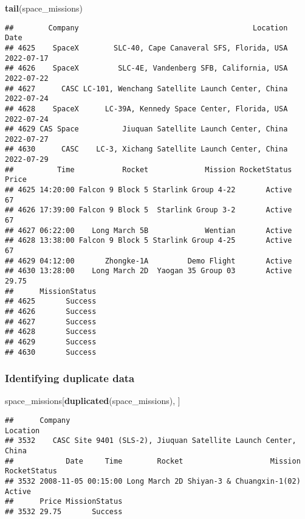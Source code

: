 \documentclass[
]{article}
\newenvironment{Shaded}{\begin{snugshade}}{\end{snugshade}}
\newcommand{\FunctionTok}[1]{\textcolor[rgb]{0.13,0.29,0.53}{\textbf{#1}}}
\newcommand{\NormalTok}[1]{#1}
\begin{document}
\begin{Shaded}
\begin{Highlighting}[]
\FunctionTok{tail}\NormalTok{(space\_missions)}
\end{Highlighting}
\end{Shaded}

\begin{verbatim}
##        Company                                        Location       Date
## 4625    SpaceX        SLC-40, Cape Canaveral SFS, Florida, USA 2022-07-17
## 4626    SpaceX         SLC-4E, Vandenberg SFB, California, USA 2022-07-22
## 4627      CASC LC-101, Wenchang Satellite Launch Center, China 2022-07-24
## 4628    SpaceX      LC-39A, Kennedy Space Center, Florida, USA 2022-07-24
## 4629 CAS Space          Jiuquan Satellite Launch Center, China 2022-07-27
## 4630      CASC    LC-3, Xichang Satellite Launch Center, China 2022-07-29
##          Time           Rocket             Mission RocketStatus Price
## 4625 14:20:00 Falcon 9 Block 5 Starlink Group 4-22       Active    67
## 4626 17:39:00 Falcon 9 Block 5  Starlink Group 3-2       Active    67
## 4627 06:22:00    Long March 5B             Wentian       Active      
## 4628 13:38:00 Falcon 9 Block 5 Starlink Group 4-25       Active    67
## 4629 04:12:00       Zhongke-1A         Demo Flight       Active      
## 4630 13:28:00    Long March 2D  Yaogan 35 Group 03       Active 29.75
##      MissionStatus
## 4625       Success
## 4626       Success
## 4627       Success
## 4628       Success
## 4629       Success
## 4630       Success
\end{verbatim}

\hypertarget{identifying-duplicate-data}{%
\subsubsection{Identifying duplicate
data}\label{identifying-duplicate-data}}

\begin{Shaded}
\begin{Highlighting}[]
\NormalTok{space\_missions[}\FunctionTok{duplicated}\NormalTok{(space\_missions), ]}
\end{Highlighting}
\end{Shaded}

\begin{verbatim}
##      Company                                                  Location
## 3532    CASC Site 9401 (SLS-2), Jiuquan Satellite Launch Center, China
##            Date     Time        Rocket                    Mission RocketStatus
## 3532 2008-11-05 00:15:00 Long March 2D Shiyan-3 & Chuangxin-1(02)       Active
##      Price MissionStatus
## 3532 29.75       Success
\end{verbatim}
\end{document}
